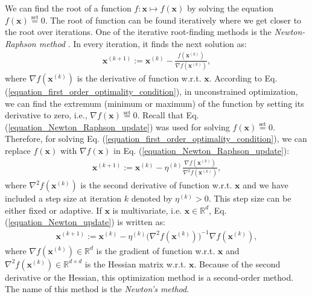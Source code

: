 \documentclass[lang=cn,10pt]{gorgeousnbook}
\numberwithin{equation}{section}%
\numberwithin{figure}{section}%
\begin{document}
We can find the root of a function $f: \boldsymbol{x} \mapsto f(\boldsymbol{x})$ by solving the equation $f(\boldsymbol{x}) \overset{\text{set}}{=} 0$. The root of function can be found iteratively where we get closer to the root over iterations. One of the iterative root-finding methods is the \textit{Newton-Raphson method} \cite{stoer2013introduction}. 
In every iteration, it finds the next solution as:
\begin{align}\label{equation_Newton_Raphson_update}
\boldsymbol{x}^{(k+1)} := \boldsymbol{x}^{(k)} - \frac{f(\boldsymbol{x}^{(k)})}{\nabla f(\boldsymbol{x}^{(k)})},
\end{align}
where $\nabla f(\boldsymbol{x}^{(k)})$ is the derivative of function w.r.t. $\boldsymbol{x}$.
According to Eq. (\ref{equation_first_order_optimality_condition}), in unconstrained optimization, we can find the extremum (minimum or maximum) of the function by setting its derivative to zero, i.e., $\nabla f(\boldsymbol{x}) \overset{\text{set}}{=} 0$.
Recall that Eq. (\ref{equation_Newton_Raphson_update}) was used for solving $f(\boldsymbol{x}) \overset{\text{set}}{=} 0$. Therefore, for solving Eq. (\ref{equation_first_order_optimality_condition}), we can replace $f(\boldsymbol{x})$ with $\nabla f(\boldsymbol{x})$ in Eq. (\ref{equation_Newton_Raphson_update}):
\begin{align}\label{equation_Newton_update}
\boldsymbol{x}^{(k+1)} := \boldsymbol{x}^{(k)} - \eta^{(k)} \frac{\nabla f(\boldsymbol{x}^{(k)})}{\nabla^2 f(\boldsymbol{x}^{(k)})},
\end{align}
where $\nabla^2 f(\boldsymbol{x}^{(k)})$ is the second derivative of function w.r.t. $\boldsymbol{x}$ and we have included a step size at iteration $k$ denoted by $\eta^{(k)} > 0$. This step size can be either fixed or adaptive. 
If $\boldsymbol{x}$ is multivariate, i.e. $\boldsymbol{x} \in \mathbb{R}^d$, Eq. (\ref{equation_Newton_update}) is written as:
\begin{align}\label{equation_Newton_update_multivariate}
\boldsymbol{x}^{(k+1)} := \boldsymbol{x}^{(k)} - \eta^{(k)} \big(\nabla^2 f(\boldsymbol{x}^{(k)})\big)^{-1} \nabla f(\boldsymbol{x}^{(k)}),
\end{align}
where $\nabla f(\boldsymbol{x}^{(k)}) \in \mathbb{R}^d$ is the gradient of function w.r.t. $\boldsymbol{x}$ and $\nabla^2 f(\boldsymbol{x}^{(k)}) \in \mathbb{R}^{d \times d}$ is the Hessian matrix w.r.t. $\boldsymbol{x}$. 
Because of the second derivative or the Hessian, this optimization method is a second-order method. The name of this method is the \textit{Newton's method}. 
\end{document}
